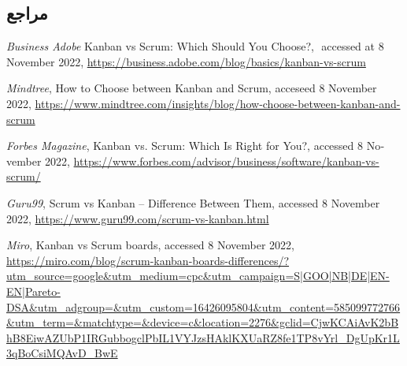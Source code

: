 \subsection*{مراجع}

\begin{latin}
	\begingroup
	\renewcommand{\section}[2]{}%
	
\begin{thebibliography}{9}

	 ‌\textit{Business Adobe}
	Kanban vs Scrum: Which Should You Choose?,  ‌
	accessed at 8 November 2022,
	\url{https://business.adobe.com/blog/basics/kanban-vs-scrum} 

	\textit{Mindtree},
	How to Choose between Kanban and Scrum, 
	acceseed 8 November 2022,
	\url{https://www.mindtree.com/insights/blog/how-choose-between-kanban-and-scrum}

	\textit{Forbes Magazine},
	Kanban vs. Scrum: Which Is Right for You?,
	accessed 8 November 2022,
	\url{https://www.forbes.com/advisor/business/software/kanban-vs-scrum/}
        
	\textit{Guru99},
	Scrum vs Kanban – Difference Between Them,
	accessed 8 November 2022,
	\url{https://www.guru99.com/scrum-vs-kanban.html}

	\textit{Miro},
	Kanban vs Scrum boards,
	accessed 8 November 2022,
	\url{https://miro.com/blog/scrum-kanban-boards-differences/?utm_source=google&utm_medium=cpc&utm_campaign=S|GOO|NB|DE|EN-EN|Pareto-DSA&utm_adgroup=&utm_custom=16426095804&utm_content=585099772766&utm_term=&matchtype=&device=c&location=2276&gclid=CjwKCAiAvK2bBhB8EiwAZUbP1IRGubbogclPbIL1VYJzsHAklKXUaRZ8fe1TP8vYrl_DgUpKr1L3qBoCsiMQAvD_BwE}
        
	
\end{thebibliography}
\endgroup
\end{latin}






